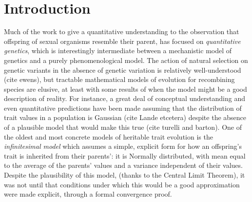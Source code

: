 \documentclass{article}
\theoremstyle{remark}
\theoremstyle{definition}
\begin{document}
\date{\today}
\maketitle

\begin{abstract}
\end{abstract}

\section{Introduction}

Much of the work to give a quantitative understanding to the observation that
offspring of sexual organisms resemble their parent,
has focused on \emph{quantitative genetics},
which is interestingly intermediate between a mechanistic model of genetics
and a purely phenomenological model.
The action of natural selection on genetic variants in the absence of genetic variation
is relatively well-understood (cite ewens),
but tractable mathematical models of evolution for recombining species
are elusive,
at least with some results of when the model might be a good description of reality.
For instance, a great deal of conceptual understanding and even quantitative predictions
have been made assuming that the distribution of trait values in a population is Gaussian
(cite Lande etcetera)
despite the absence of a plausible model that would make this true (cite turelli and barton).
One of the oldest and most concrete models of heritable trait evolution is the \emph{infinitesimal model}
which assumes a simple, explicit form for how an offspring's trait is inherited from their parents':
it is Normally distributed, with mean equal to the average of the parents' values
and a variance independent of their values.
Despite the plausibility of this model,
(thanks to the Central Limit Theorem),
it was not until \citet{barton2017infinitesimal} that conditions under which this would be a good approximation
were made explicit,
through a formal convergence proof.
\end{document}
